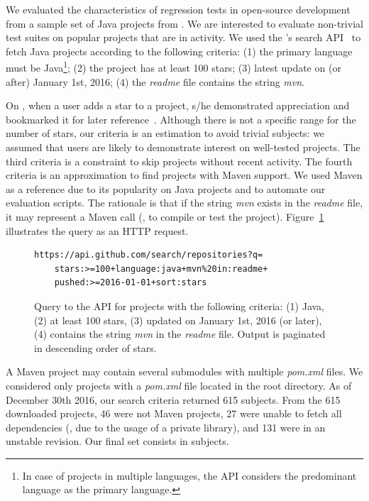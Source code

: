 We evaluated the characteristics of regression tests in open-source
development from a sample set of Java projects from \github{}.  We are
interested to evaluate non-trivial test suites on popular projects
that are in activity. We used the \github{}'s search
API~\cite{githubsearch} to fetch Java projects according to the
following criteria: (1) the primary language must be Java\footnote{In
case of projects in multiple languages, the \github{} API considers
the predominant language as the primary language.}; (2) the project
has at least 100 stars; (3) latest update on (or after) January 1st,
2016; (4) the \emph{readme} file contains the string \emph{mvn}.

On \github{}, when a user adds a star to a project, s/he demonstrated
appreciation and bookmarked it for later
reference~\cite{github-stars}.  Although there is not a specific range
for the number of stars, our criteria is an estimation to avoid
trivial subjects: we assumed that \github{} users are likely to
demonstrate interest on well-tested projects. The third criteria is a
constraint to skip projects without recent activity. The fourth
criteria is an approximation to find projects with Maven support. We
used Maven as a reference due to its popularity on Java projects and
to automate our evaluation scripts. The rationale is that if the
string \emph{mvn} exists in the \emph{readme} file, it may represent a
Maven call (\eg, to compile or test the project).
Figure~\ref{fig:subject-query} illustrates the query as an HTTP
request.

\begin{figure}[h!]
\centering
\scriptsize
{}
\begin{lstlisting}
https://api.github.com/search/repositories?q=
    stars:>=100+language:java+mvn%20in:readme+
    pushed:>=2016-01-01+sort:stars

\end{lstlisting}
    \caption{\label{fig:subject-query} Query to the \github{} API for
    projects with the following criteria: (1) Java, (2) at least 100
    stars, (3) updated on January 1st, 2016 (or later), (4) contains
    the string \emph{mvn} in the \emph{readme} file. Output is
    paginated in descending order of stars.}
\end{figure}

A Maven project may contain several submodules with multiple
\emph{pom.xml} files. We considered only projects with a
\emph{pom.xml} file located in the root directory.  As of December
30th 2016, our search criteria returned 615 subjects. From the 615
downloaded projects, 46 were not Maven projects, 27 were unable to
fetch all dependencies (\eg, due to the usage of a private library),
and 131 were in an unstable revision. Our final set consists in
\numSubjs{} subjects.

